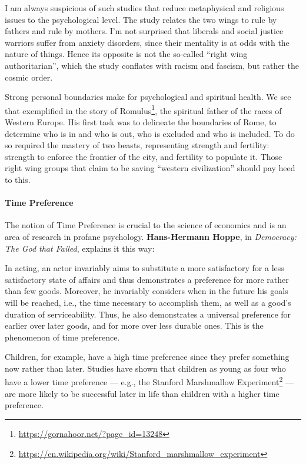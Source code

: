 I am always suspicious of such studies that reduce metaphysical and religious issues to the psychological level. The study relates the two wings to rule by fathers and rule by mothers. I'm not surprised that liberals and social justice warriors suffer from anxiety disorders, since their mentality is at odds with the nature of things. Hence its opposite is not the so-called ``right wing authoritarian'', which the study conflates with racism and fascism, but rather the cosmic order.

Strong personal boundaries make for psychological and spiritual health. We see that exemplified in the story of Romulus\footnote{\url{https://gornahoor.net/?page\_id=13248}}, the spiritual father of the races of Western Europe. His first task was to delineate the boundaries of Rome, to determine who is in and who is out, who is excluded and who is included. To do so required the mastery of two beasts, representing strength and fertility: strength to enforce the frontier of the city, and fertility to populate it. Those right wing groups that claim to be saving ``western civilization'' should pay heed to this.

\paragraph{Time Preference}


The notion of Time Preference is crucial to the science of economics and is an area of research in profane psychology. \textbf{Hans-Hermann Hoppe}, in \emph{Democracy: The God that Failed}, explains it this way:

\begin{quotex}
In acting, an actor invariably aims to substitute a more satisfactory for a less satisfactory state of affairs and thus demonstrates a preference for more rather than few goods. Moreover, he invariably considers when in the future his goals will be reached, i.e., the time necessary to accomplish them, as well as a good's duration of serviceability. Thus, he also demonstrates a universal preference for earlier over later goods, and for more over less durable ones. This is the phenomenon of time preference.
\end{quotex}


Children, for example, have a high time preference since they prefer something now rather than later. Studies have shown that children as young as four who have a lower time preference --- e.g., the Stanford Marshmallow Experiment\footnote{\url{https://en.wikipedia.org/wiki/Stanford\_marshmallow\_experiment}} --- are more likely to be successful later in life than children with a higher time preference.


